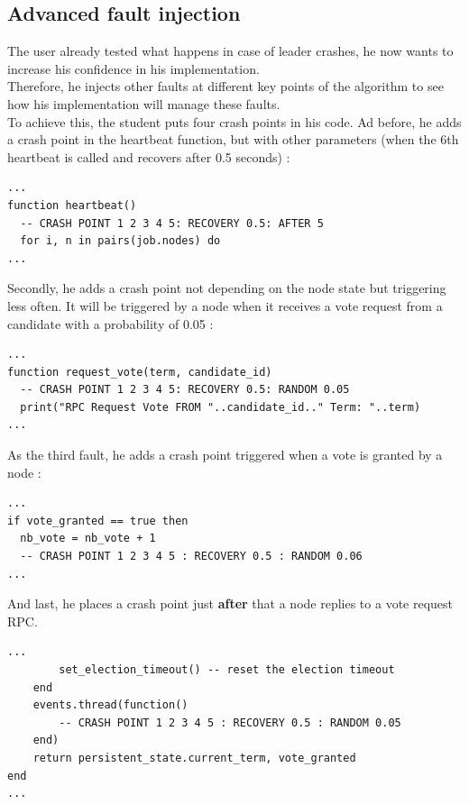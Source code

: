 \documentclass{eplmastersthesis}
\begin{document}
      \subsection{Advanced fault injection}

        The user already tested what happens in case of leader crashes, he now
        wants to increase his confidence in his implementation.\\
        Therefore, he injects other faults at different key points of the
        algorithm to see how his implementation will manage these faults.\\

        To achieve this, the student puts four crash points in his code.
        Ad before, he adds a crash point in the heartbeat function, but with
        other parameters (when the 6th heartbeat is called and recovers
        after 0.5 seconds) :

        \begin{lstlisting}[style=MyLua]
...
function heartbeat()
  -- CRASH POINT 1 2 3 4 5: RECOVERY 0.5: AFTER 5
  for i, n in pairs(job.nodes) do
...
        \end{lstlisting}

        Secondly, he adds a crash point not depending on the
        node state but triggering less often. It will be triggered by a node
        when it receives a vote request from a candidate with a probability
        of 0.05 :

        \begin{lstlisting}[style=MyLua]
...
function request_vote(term, candidate_id)
  -- CRASH POINT 1 2 3 4 5: RECOVERY 0.5: RANDOM 0.05
  print("RPC Request Vote FROM "..candidate_id.." Term: "..term)
...
        \end{lstlisting}

        As the third fault, he adds a crash point triggered when a vote is
        granted by a node :

        \begin{lstlisting}[style=MyLua]
...
if vote_granted == true then
  nb_vote = nb_vote + 1
  -- CRASH POINT 1 2 3 4 5 : RECOVERY 0.5 : RANDOM 0.06
...
        \end{lstlisting}

        And last, he places a crash point just \textbf{after} that a
        node replies to a vote request RPC.

        \begin{lstlisting}[style=MyLua]
...
        set_election_timeout() -- reset the election timeout
    end
    events.thread(function()
        -- CRASH POINT 1 2 3 4 5 : RECOVERY 0.5 : RANDOM 0.05
    end)
    return persistent_state.current_term, vote_granted
end
...
        \end{lstlisting}
\end{document}
